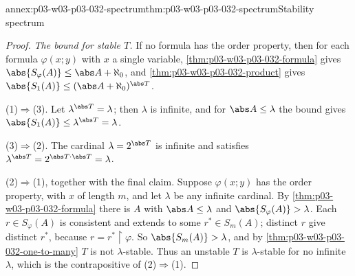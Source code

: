 \begin{annexitem}{annex:p03-w03-p03-032-spectrum}{thm:p03-w03-p03-032-spectrum}{Stability spectrum}
\begin{proof}
\emph{The bound for stable \(T\).}  If no formula has the order property,
then for each formula \(\varphi(x;y)\) with \(x\) a single variable,
\cref{thm:p03-w03-p03-032-formula} gives
\(\abs{S_\varphi(A)}\leq\abs A+\aleph_0\), and
\cref{thm:p03-w03-p03-032-product} gives
\(\abs{S_1(A)}\leq(\abs A+\aleph_0)^{\abs T}\).

(1)\(\Rightarrow\)(3).  Let \(\lambda^{\abs T}=\lambda\); then \(\lambda\) is
infinite, and for \(\abs A\leq\lambda\) the bound gives
\(\abs{S_1(A)}\leq\lambda^{\abs T}=\lambda\).

(3)\(\Rightarrow\)(2).  The cardinal \(\lambda=2^{\abs T}\) is infinite and
satisfies \(\lambda^{\abs T}=2^{\abs T\cdot\abs T}=\lambda\).

(2)\(\Rightarrow\)(1), together with the final claim.  Suppose
\(\varphi(x;y)\) has the order property, with \(x\) of length \(m\), and let
\(\lambda\) be any infinite cardinal.  By
\cref{thm:p03-w03-p03-032-formula} there is \(A\) with \(\abs A\leq\lambda\)
and \(\abs{S_\varphi(A)}>\lambda\).  Each \(r\in S_\varphi(A)\) is
consistent and extends to some \(r^*\in S_m(A)\); distinct \(r\) give
distinct \(r^*\), because \(r=r^*\mathbin{\upharpoonright}\varphi\).  So
\(\abs{S_m(A)}>\lambda\), and by \cref{thm:p03-w03-p03-032-one-to-many}
\(T\) is not \(\lambda\)-stable.  Thus an unstable \(T\) is
\(\lambda\)-stable for no infinite \(\lambda\), which is the contrapositive
of (2)\(\Rightarrow\)(1).
\end{proof}
\end{annexitem}

